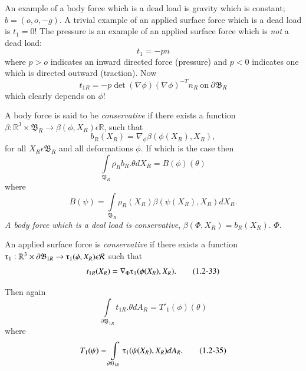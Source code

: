 An example of a body force which is a dead load is gravity which is
constant; $b = (o,o,-g)$. A trivial example of an applied surface
force which is a dead load is $t_1 = 0!$ The pressure is an example of
an applied surface force which is \textit{not} a dead load: 
\begin{equation*}
t_1 = - pn\tag{1.2-29}\label{eq1.2-29}
\end{equation*}
where $p > o $ indicates an inward directed force (pressure) and $p <
0 $ indicates one which is directed outward (traction). Now 
$$
t_{1R} = - p \det (\nabla\phi) (\nabla\phi)^{-T} n_R
~\text{on}~ \partial\mathfrak{B}_R 
$$
which clearly depends on $\phi !$

A body force is said to be \textit{conservative} if there exists a
function $\beta : \mathbb{R}^3 \times \mathfrak{B}_R \to \beta(\phi,
X_R) \epsilon \mathbb{R}$, such that 
\begin{equation*}
b_R(X_R) = \nabla_{\phi}\beta(\phi(X_R),X_R), \tag{1.2-30}\label{eq1.2-30}
\end{equation*}
for all $X_R \epsilon \mathfrak{B}_R$ and all deformations
$\phi$. If which is the case then  
\begin{equation*}
  \int\limits_{\mathfrak{B}_R} \rho_R b_R.\theta dX_R = B(\phi)
  (\theta)\tag{1.2-31} \label{eq1.2-31}
\end{equation*}
where
\begin{equation*}
  B(\psi) = \int\limits_{\mathfrak{B}_R} \rho_R (X_R)
  \beta(\psi(X_R),X_R) dX_R.\tag{1.2-32} \label{eq1.2-32}
\end{equation*}\pageoriginale
\textit{A body force which is a deal load is conservative},
$\beta(\Phi,X_R) = b_R (X_R)$. $\Phi$. 

An applied surface force is
\textit{conservative} if there exists a
function $\tauup_1 : \mathbb{R}^3 \times \partial \mathfrak{B}_{1R}
\rightarrow \tauup_1 (\phi,X_R) \epsilon \mathcal{R}$ such that 
\begin{equation*}
t_{1R}(X_R) = \nabla_{\Phi} \tauup_1
(\phi(X_R),X_R).\tag{1.2-33}\label{eq1.2-33} 
\end{equation*}

Then again
\begin{equation*}
\int\limits_{\partial\mathfrak{B}_{1R}} t_{1R}.\theta dA_R =
T'_1(\phi)(\theta)\tag{1.2-34} \label{eq1.2-34}
\end{equation*}
where
\begin{equation*}
T_1(\psi) = \int\limits_{\partial\mathfrak{B}_{1R}}
\tauup_1(\psi(X_R),X_R) dA_R.\tag{1.2-35} \label{eq1.2-35}
\end{equation*}

